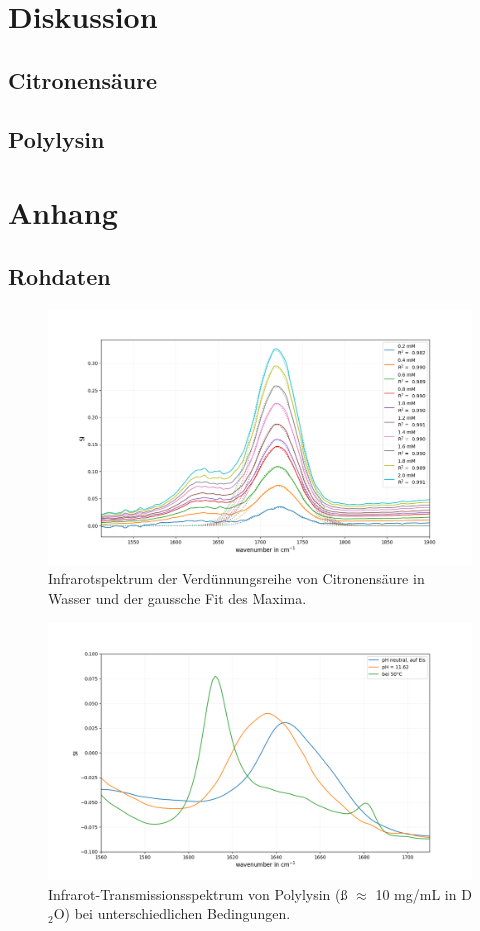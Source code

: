 \documentclass[10pt,a4paper]{article}
\begin{document}
	\section{Diskussion}
	\subsection{Citronensäure}
	\subsection{Polylysin}
	
	\section{Anhang}
	\subsection{Rohdaten}
		
		\begin{figure}[H]
			\centering
			\includegraphics[scale=0.55]{Standardcurve_citricacid_fit.png}
			\caption{Infrarotspektrum der Verdünnungsreihe von Citronensäure in Wasser und der gaussche Fit des Maxima.}
			\label{fig:IR_Standardcurve}
		\end{figure}
	
		\begin{figure}[H]
		\centering
		\includegraphics[scale=0.55]{Polylysin.png}
		\caption{Infrarot-Transmissionsspektrum von Polylysin (ß $\approx$ 10 mg/mL in D$_2$O) bei unterschiedlichen Bedingungen.}
		\label{fig:polylysion_IR_Spektrum}
		\end{figure}
	
\end{document}
